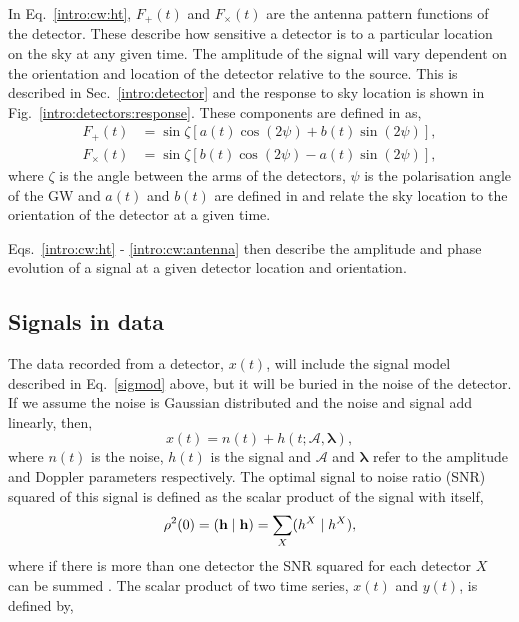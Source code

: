 In Eq.~\ref{intro:cw:ht}, $F_+(t)$ and $F_{\times}(t)$ are the antenna pattern functions of the detector. 
These describe how sensitive a detector is to a particular location on the sky at any given time. 
The amplitude of the signal will vary dependent on the orientation and location of the detector relative to the source.
This is described in Sec.~\ref{intro:detector} and the response to sky location is shown in Fig.~\ref{intro:detectors:response}.
These components are defined in \citep{Schutz1998DataDetection} as,
\begin{equation}
\label{intro:cw:antenna}
\begin{split}
F_{+}(t) &= \sin{\zeta}[a(t)\cos{(2\psi)} + b(t)\sin{(2\psi)}], \\
F_{\times}(t) &= \sin{\zeta}[b(t) \cos{(2\psi)} - a(t)\sin{(2\psi)}],
\end{split}
\end{equation}
where $\zeta$ is the angle between the arms of the detectors, $\psi$ is the polarisation angle of the \ac{GW} and $a(t)$ and $b(t)$ are defined in \citep{Schutz1998DataDetection} and relate the sky location to the orientation of the detector at a given time. 

Eqs.~\ref{intro:cw:ht} - \ref{intro:cw:antenna} then describe the amplitude and phase evolution of a signal at a given detector location and orientation.


\subsection{\label{intro:search:signals} Signals in data}

The data recorded from a detector, $x(t)$, will include the signal model described in Eq.~\ref{sigmod} above, but it will be buried in the noise of the detector. 
If we assume the noise is Gaussian distributed and the noise and signal add linearly, then,  
\begin{equation}
\label{signalinnoise}
x(t) = n(t) + h(t; \mathcal{A},{\boldsymbol \lambda}) ,
\end{equation}
where $n(t)$ is the noise, $h(t)$ is the signal and $\mathcal{A}$ and ${\boldsymbol \lambda}$ refer to the amplitude and Doppler parameters respectively. 
The optimal signal to noise ratio (SNR) squared of this signal is defined as the scalar product of the signal with itself,
\begin{equation}
\rho^2(0) = ({\bf h} \mid {\bf h}) = \sum_X(h^X \mid h^X),
\end{equation}
where if there is more than one detector the SNR squared for each detector $X$ can be summed \citep{Prix2007}. 
The scalar product of two time series, $x(t)$ and $y(t)$, is defined by,

